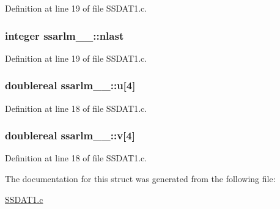Definition at line 19 of file S\+S\+D\+A\+T1.\+c.

\subsubsection[{\texorpdfstring{nlast}{nlast}}]{\setlength{\rightskip}{0pt plus 5cm}integer ssarlm\+\_\+\_\+\+::nlast}\hypertarget{structssarlm__1___a90ce3bb9aa7af3f97dcd3e0a1d16b548}{}\label{structssarlm__1___a90ce3bb9aa7af3f97dcd3e0a1d16b548}


Definition at line 19 of file S\+S\+D\+A\+T1.\+c.

\subsubsection[{\texorpdfstring{u}{u}}]{\setlength{\rightskip}{0pt plus 5cm}doublereal ssarlm\+\_\+\_\+\+::u\mbox{[}4\mbox{]}}\hypertarget{structssarlm__1___acd10fab3db576eb1dab510d085dc18f1}{}\label{structssarlm__1___acd10fab3db576eb1dab510d085dc18f1}


Definition at line 18 of file S\+S\+D\+A\+T1.\+c.

\subsubsection[{\texorpdfstring{v}{v}}]{\setlength{\rightskip}{0pt plus 5cm}doublereal ssarlm\+\_\+\_\+\+::v\mbox{[}4\mbox{]}}\hypertarget{structssarlm__1___a6906d42d2736bd2abc40f3fef36deb81}{}\label{structssarlm__1___a6906d42d2736bd2abc40f3fef36deb81}


Definition at line 18 of file S\+S\+D\+A\+T1.\+c.



The documentation for this struct was generated from the following file\+:\begin{DoxyCompactItemize}
\item 
\hyperlink{SSDAT1_8c}{S\+S\+D\+A\+T1.\+c}\end{DoxyCompactItemize}
